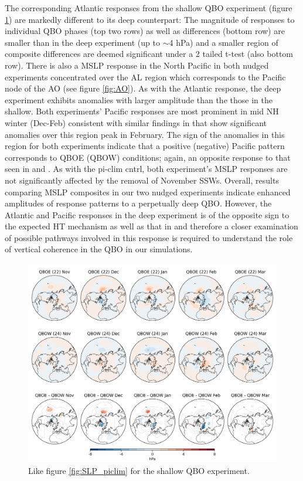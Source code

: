 The corresponding Atlantic responses from the shallow QBO experiment (figure \ref{fig:SLP_shallow}) are markedly different to its deep counterpart: The magnitude of responses to individual QBO phases (top two rows) as well as differences (bottom row) are smaller than in the deep experiment (up to $\sim$4 hPa) and a smaller region of composite differences are deemed significant under a 2 tailed t-test (also bottom row). There is also a MSLP response in the North Pacific in both nudged experiments concentrated over the AL region which corresponds to the Pacific node of the AO (see figure \ref{fig:AO}). As with the Atlantic response, the deep experiment exhibits anomalies with larger amplitude than the those in the shallow. Both experiments' Pacific responses are most prominent in mid NH winter (Dec-Feb) consistent with similar findings in \cite{graySurface2018b} that show significant anomalies over this region peak in February. The sign of the anomalies in this region for both experiments indicate that a positive (negative) Pacific pattern corresponds to QBOE (QBOW) conditions; again, an opposite response to that seen in \cite{andrewsObserved2019d} and \cite{graySurface2018b}. As with the pi-clim cntrl, both experiment's MSLP responses are not significantly affected by the removal of November SSWs. Overall, results comparing MSLP composites in our two nudged experiments indicate enhanced amplitudes of response patterns to a perpetually deep QBO. However, the Atlantic and Pacific responses in the deep experiment is of the opposite sign to the expected HT mechanism as well as that in \citep{andrewsObserved2019d} and therefore a closer examination of possible pathways involved in this response is required to understand the role of vertical coherence in the QBO in our simulations.

\begin{figure}[h!]
\begin{center}
\noindent\includegraphics[width =0.8\linewidth]{Figures/Figures-deepQBO/LAGGED_SLP_composites_individual_months_QBO_phases_U_s_50hPa_5thresh.png}
\caption[MSLP composites under different QBO phases in the shallow QBO simulation]{Like figure \ref{fig:SLP_piclim} for the shallow QBO experiment.}
\label{fig:SLP_shallow}
\end{center}
\end{figure}
\newpage

